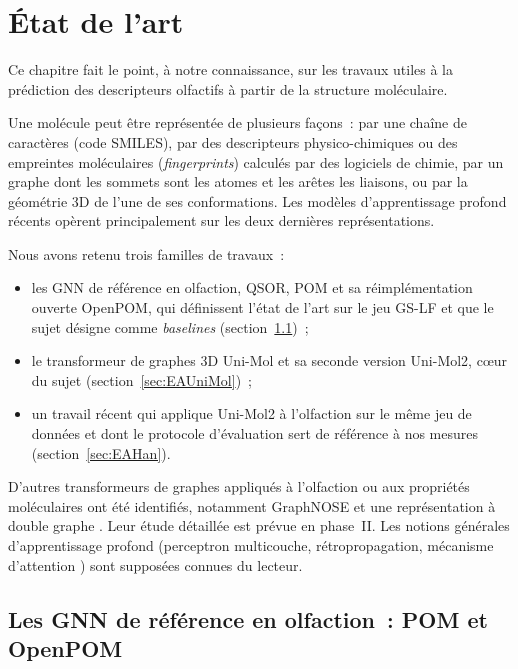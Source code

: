 \chapter{\'Etat de l'art}
\label{chap:EtatArt}

Ce chapitre fait le point, à notre connaissance, sur les travaux utiles à la prédiction des descripteurs olfactifs à partir de la structure moléculaire.

Une molécule peut être représentée de plusieurs façons~: par une chaîne de caractères (code SMILES), par des descripteurs physico-chimiques ou des empreintes moléculaires (\emph{fingerprints}) calculés par des logiciels de chimie, par un graphe dont les sommets sont les atomes et les arêtes les liaisons, ou par la géométrie 3D de l'une de ses conformations.
Les modèles d'apprentissage profond récents opèrent principalement sur les deux dernières représentations.

Nous avons retenu trois familles de travaux~:
\begin{itemize}
   \item les GNN de référence en olfaction, QSOR, POM et sa réimplémentation ouverte OpenPOM, qui définissent l'état de l'art sur le jeu GS-LF et que le sujet désigne comme \emph{baselines} (section~\ref{sec:EAPom})~;
   \item le transformeur de graphes 3D Uni-Mol et sa seconde version Uni-Mol2, cœur du sujet (section~\ref{sec:EAUniMol})~;
   \item un travail récent qui applique Uni-Mol2 à l'olfaction sur le même jeu de données et dont le protocole d'évaluation sert de référence à nos mesures (section~\ref{sec:EAHan}).
\end{itemize}

D'autres transformeurs de graphes appliqués à l'olfaction ou aux propriétés moléculaires ont été identifiés, notamment GraphNOSE \cite{Sharma-2026} et une représentation à double graphe \cite{Zhang-2026}.
Leur étude détaillée est prévue en phase~II.
Les notions générales d'apprentissage profond (perceptron multicouche, rétropropagation, mécanisme d'attention \cite{Vaswani-2017}) sont supposées connues du lecteur.


\section{Les GNN de référence en olfaction~: POM et OpenPOM}
\label{sec:EAPom}

